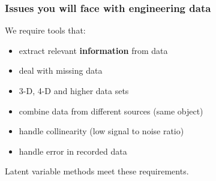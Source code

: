 \begin{frame}\frametitle{Issues you will face with engineering data}

	We require tools that:
	\begin{itemize}
		\item	extract relevant \textbf{information} from data
		\item	deal with missing data
		\item	3-D, 4-D and higher data sets
		\item	combine data from different sources (same object)
		\item	handle collinearity (low signal to noise ratio)
		\item	handle error in recorded data
	\end{itemize}

	Latent variable methods meet these requirements.
\end{frame}

